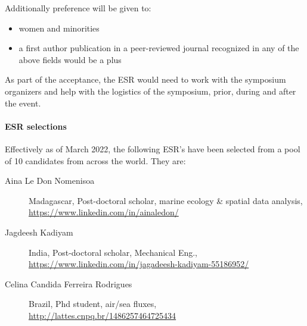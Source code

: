 \noindent
Additionally preference will be given to:

\begin{itemize}[noitemsep,topsep=0pt,parsep=0pt,partopsep=0pt]
\item women and minorities
\item a first author publication in a peer-reviewed journal recognized
  in any of the above fields would be a plus 
\end{itemize}

\noindent
As part of the acceptance, the ESR would need to work with the symposium
organizers and help with the logistics of the symposium, prior, during
and after the event. %

\paragraph{ESR selections} Effectively as of March 2022, the following
ESR's have been selected from a pool of 10 candidates from across the
world. They are:

\begin{description}

  \item[Aina Le Don Nomenisoa] Madagascar, Post-doctoral scholar,
    marine ecology \& spatial data analysis, \url{https://www.linkedin.com/in/ainaledon/}

  \item[Jagdeesh Kadiyam] India, Post-doctoral scholar, Mechanical Eng., \url{https://www.linkedin.com/in/jagadeesh-kadiyam-55186952/}

  \item[Celina Candida Ferreira Rodrigues] Brazil, Phd student, air/sea fluxes, \url{http://lattes.cnpq.br/1486257464725434}

\end{description}  

